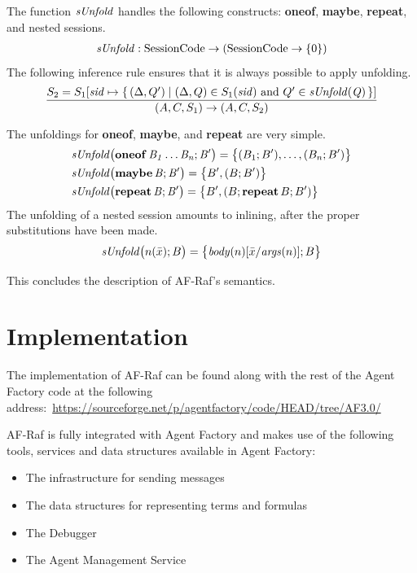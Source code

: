 \documentclass[a4paper,12pt,oneside,fleqn]{book} %
\begin{document}
{The function $\it sUnfold$ handles the following constructs: {\bf oneof},
{\bf maybe}, {\bf repeat}, and nested sessions.
\begin{align}
{\it sUnfold} : {\rm SessionCode}\to({\rm SessionCode}\to\{0\})
\end{align}
The following inference rule ensures that it is always possible to apply
unfolding.
\begin{align}
\frac
  {S_2=S_1[{\it sid}\mapsto\{\,(\Delta,Q')
    \mid\text{$(\Delta,Q)\in S_1({\it sid})$ and $Q'\in{\it sUnfold(Q)}$}\,\}]}
  {(A,C,S_1)\to(A,C,S_2)}
\end{align}

The unfoldings for {\bf oneof}, {\bf maybe}, and {\bf repeat} are very
simple.
\begin{align}
&{\it sUnfold\bigl({\bf oneof}\,B_1\ldots B_n; B'\bigr)}
  = \bigl\{ (B_1;B'),\ldots,(B_n;B')\bigr\}
\\
&{\it sUnfold\bigl({\bf maybe}\,B;B'\bigr)}
  = \bigl\{ B', (B;B')\bigr\} \\
&{\it sUnfold\bigl({\bf repeat}\,B;B'\bigr)}
  = \bigl\{ B', (B;{\bf repeat}\,B;B')\bigr\}
\end{align}
The unfolding of a nested session amounts to inlining, after the proper
substitutions have been made.
\begin{align}
{\it sUnfold}\bigl(n(\bar{x}); B\bigr)
  = \bigl\{ {\it body}(n)[\bar{x}/{\it args}(n)]; B \bigr\}
\end{align}

This concludes the description of AF-Raf's semantics.

\chapter{Implementation}\label{ch:implem} %

The implementation of AF-Raf can be found along with the rest of
the Agent Factory code at the following
address:~\url{https://sourceforge.net/p/agentfactory/code/HEAD/tree/AF3.0/}

AF-Raf is fully integrated with Agent Factory and makes use of the
following tools, services and data structures available in Agent Factory:

\begin{itemize}
    \item The infrastructure for sending messages
    \item The data structures for representing terms and formulas
    \item The Debugger
    \item The Agent Management Service
\end{itemize}

}
\end{document}
